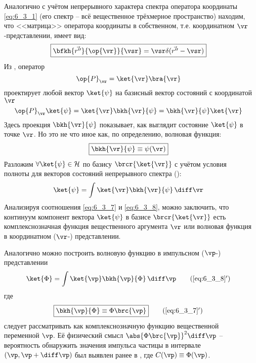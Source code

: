 Аналогично с учётом непрерывного характера спектра оператора координаты \eqref{eq:6_3_1} (его спектр -- всё вещественное трёхмерное пространство) находим, что <<матрица>> оператора координаты в собственном, т.е. координатном $\vr$-представлении, имеет вид:%
\begin{equation}
\label{eq:6_3_4}
\boxed{\bfkh{\vec{r''}}{\op{\vr}}{\vsr}=\vsr \delta(\vec{r''}-\vsr)}
\end{equation}%
%
Из , оператор
\begin{equation}
\label{eq:6_3_5}
\op{P}_{\vr}=\ket{\vr}\bra{\vr}
\end{equation}%
%
проектирует любой вектор $\ket{\psi}$ на базисный вектор состояний с координатой $\vr$
\begin{equation}
\label{eq:6_3_6}
\op{P}_{\vr} \ket{\psi} = \ket{\vr}\bkh{\vr}{\psi} = \bkh{\vr}{\psi} \ket{\vr}
\end{equation}%
%
Здесь проекция $\bkh{\vr}{\psi}$ показывает, как выглядит состояние $\ket{\psi}$ в точке $\vr$. Но это не что иное как, по определению, волновая функция:
\begin{equation}
\label{eq:6_3_7}
\boxed{
	\bkh{\vr}{\psi} \equiv \psi(\vr)
}
\end{equation}%
%
Разложим $\forall \ket{\psi} \in \mathcal{H}$ по базису $\brcr{\ket{\vr}}$ с учётом условия полноты для векторов состояний непрерывного спектра ():
\begin{equation}
\label{eq:6_3_8}
\ket{\psi}=\int \ket{\vr}\bkh{\vr}{\psi} \, \diff\vr
\end{equation}%
%
Анализируя соотношения \eqref{eq:6_3_7} и \eqref{eq:6_3_8}, можно заключить, что континуум компонент вектора $\ket{\psi}$ в базисе $\brcr{\ket{\vr}}$ есть комплекснозначная функция вещественного аргумента $\vr$ или волновая функция в координатном ($\vr$-) представлении.

Аналогично можно построить волновую функцию в импульсном ($\vp$-) представлении
\begin{equation}
\label{eq:6_3_8_add}
\ket{\Phi}=\int \ket{\vp}\bkh{\vp}{\Phi} \, \diff\vp
\tag{\ref{eq:6_3_8}$'$}
\end{equation}%
где%
\begin{equation}
\label{eq:6_3_7_add}
\boxed{\bkh{\vp}{\Phi} \equiv \Phi\brc{\vp}}
\tag{\ref{eq:6_3_7}$'$}
\end{equation}%
%
следует рассматривать как комплекснозначную функцию вещественной переменной $\vp$. Её физический смысл $\abs{\Phi\brc{\vp}}^2 \diff\vp$ -- вероятность обнаружить значения импульса частицы в интервале $(\vp, \vp+\diff\vp)$ был выявлен ранее в , где $C(\vp) \equiv \Phi(\vp)$.

